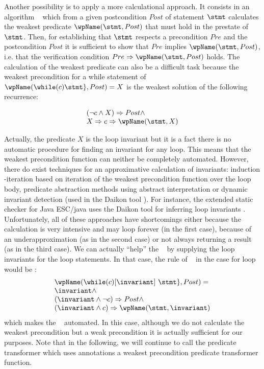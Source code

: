 Another possibility is to apply a  more calculational approach. It consists in an algorithm \wpName~ which 
from a given postcondition $Post$   of statement $\stmt$ calculates the weakest predicate $\wpName(\stmt, Post)$ 
that must hold in the  prestate of $\stmt$. Then, for establishing that
  $\stmt$ respects a precondition  $Pre$ and the postcondition   $Post$ it is sufficient to show that $Pre$ implies $\wpName(\stmt, Post) $, i.e. that 
the verification condition $Pre \Rightarrow \wpName(\stmt, Post)$ holds. 
The calculation of the weakest predicate can also be a difficult task because  the weakest precondition for a while statement of
$\wpName( \while ( c ) \do \{ \stmt \} ,Post) = X$ is the weakest solution of the following recurrence:

$$\begin{array}{l}
(\neg c \wedge X) \Rightarrow  Post \wedge \\
X \Rightarrow c \Rightarrow \wpName (\stmt, X) 
\end{array}$$
 
 Actually, the predicate $X$ is the loop invariant but it is a fact there is no automatic procedure for finding an invariant for any loop.
 This means that the weakest precondition function can neither be completely automated. However, there do exist techniques for an approximative calculation of invariants: 
induction -iteration  \cite{SI77IABC} based on iteration of the weakest precondition function over the loop body,
predicate abstraction methods \cite{FQ03PAQ} using abstract interpretation or dynamic invariant detection (used in the Daikon tool \cite{ernst99dynamically}).
For instance, the extended static checker for Java ESC/java uses the Daikon tool  for inferring loop invariants \cite{NimmerE01:RV}.  
Unfortunately, all of these approaches have shortcomings either because the calculation is very intensive and may loop forever (in the first case),
 because  of an underapproximation (as in the second case) or not always returning 
a result (as in the third case). We can actually ``help'' the \wpName~ by supplying the loop invariants for the loop statements.
 In that case, the rule of \wpName~ in the case for loop would be :
$$ \begin{array}{l} 
    \wpName ( \while  ( c ) \lbrack \invariant \rbrack \  \do \{ \stmt \} ,Post) = \\
   \invariant \wedge \\
   (\invariant \wedge \neg c) \Rightarrow Post  \wedge \\
    (\invariant \wedge  c) \Rightarrow \wpName(\stmt, \invariant)
   \end{array} $$
which makes the \wpName~ automated.  In this case, although we do not calculate the weakest precondition but a weak precondition it is actually 
sufficient for our purposes. Note that in the following, we will continue to call  the predicate transformer which uses annotations a
 weakest precondition predicate transformer function. 

